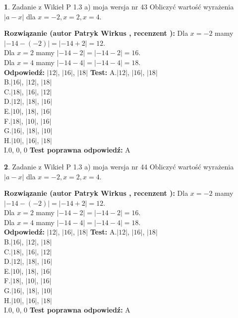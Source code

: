\documentclass[12pt, a4paper]{article}
\theoremstyle{definition} %
\newtheorem{zad}{}
\newcommand{\zadStart}[1]{\begin{zad}#1\newline}
\newcommand{\zadStop}{\end{zad}}
\newcommand{\rozwStart}[2]{\noindent \textbf{Rozwiązanie (autor #1 , recenzent #2): }\newline}
\newcommand{\rozwStop}{\newline}
\newcommand{\odpStart}{\noindent \textbf{Odpowiedź:}\newline}
\newcommand{\odpStop}{\newline}
\newcommand{\testStart}{\noindent \textbf{Test:}\newline}
\newcommand{\testStop}{\newline}
\newcommand{\kluczStart}{\noindent \textbf{Test poprawna odpowiedź:}\newline}
\newcommand{\kluczStop}{\newline}
\begin{document}
\zadStart{Zadanie z Wikieł P 1.3 a) moja wersja nr 43}
Obliczyć wartość wyrażenia $|a - x|$ dla $x=-2,x=2,x=4$.
\zadStop
\rozwStart{Patryk Wirkus}{}
Dla $x = -2$ mamy $|-14 - (-2)| = |-14 + 2| = 12$.\\
Dla $x = 2$ mamy $|-14 - 2| = |-14 - 2| = 16$.\\
Dla $x = 4$ mamy $|-14 - 4| = |-14 - 4| = 18$.\\
\rozwStop
\odpStart
$|12|$, $|16|$, $|18|$
\odpStop
\testStart
A.$|12|$, $|16|$, $|18|$\\
B.$|16|$, $|12|$, $|18|$\\
C.$|18|$, $|16|$, $|12|$\\
D.$|12|$, $|18|$, $|16|$\\
E.$|10|$, $|18|$, $|16|$\\
F.$|18|$, $|10|$, $|16|$\\
G.$|16|$, $|18|$, $|10|$\\
H.$|10|$, $|16|$, $|18|$\\
I.$0$, $0$, $0$
\testStop
\kluczStart
A
\kluczStop



\zadStart{Zadanie z Wikieł P 1.3 a) moja wersja nr 44}
Obliczyć wartość wyrażenia $|a - x|$ dla $x=-2,x=2,x=4$.
\zadStop
\rozwStart{Patryk Wirkus}{}
Dla $x = -2$ mamy $|-14 - (-2)| = |-14 + 2| = 12$.\\
Dla $x = 2$ mamy $|-14 - 2| = |-14 - 2| = 16$.\\
Dla $x = 4$ mamy $|-14 - 4| = |-14 - 4| = 18$.\\
\rozwStop
\odpStart
$|12|$, $|16|$, $|18|$
\odpStop
\testStart
A.$|12|$, $|16|$, $|18|$\\
B.$|16|$, $|12|$, $|18|$\\
C.$|18|$, $|16|$, $|12|$\\
D.$|12|$, $|18|$, $|16|$\\
E.$|10|$, $|18|$, $|16|$\\
F.$|18|$, $|10|$, $|16|$\\
G.$|16|$, $|18|$, $|10|$\\
H.$|10|$, $|16|$, $|18|$\\
I.$0$, $0$, $0$
\testStop
\kluczStart
A
\kluczStop
\end{document}
